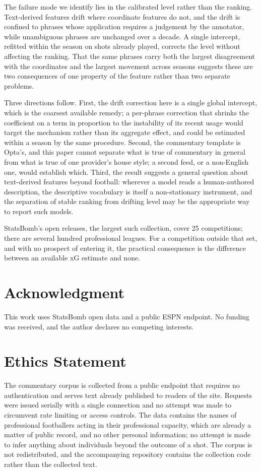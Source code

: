 \documentclass[conference]{IEEEtran}
\begin{document}
The failure mode we identify lies in the calibrated level rather than the
ranking. Text-derived features drift where coordinate features do not, and the
drift is confined to phrases whose application requires a judgement by the
annotator, while unambiguous phrases are unchanged over a decade. A single
intercept, refitted within the season on shots already played, corrects the
level without affecting the ranking. That the same phrases carry both the
largest disagreement with the coordinates and the largest movement across
seasons suggests these are two consequences of one property of the feature
rather than two separate problems.

Three directions follow. First, the drift correction here is a single global
intercept, which is the coarsest available remedy; a per-phrase correction
that shrinks the coefficient on a term in proportion to the instability of its
recent usage would target the mechanism rather than its aggregate effect, and
could be estimated within a season by the same procedure. Second, the
commentary template is Opta's, and this paper cannot separate what is true of
commentary in general from what is true of one provider's house style; a
second feed, or a non-English one, would establish which. Third, the result
suggests a general question about text-derived features beyond football:
wherever a model reads a human-authored description, the descriptive vocabulary
is itself a non-stationary instrument, and the separation of stable ranking
from drifting level may be the appropriate way to report such models.

StatsBomb's open releases, the largest such collection, cover 25
competitions; there are several hundred professional leagues. For a competition
outside that set, and with no prospect of entering it, the practical
consequence is the difference between an available xG estimate and none.

\section*{Acknowledgment}

This work uses StatsBomb open data and a public ESPN endpoint. No funding was
received, and the author declares no competing interests.

\section*{Ethics Statement}

The commentary corpus is collected from a public endpoint that requires no
authentication and serves text already published to readers of the site.
Requests were issued serially with a single connection and no attempt was made
to circumvent rate limiting or access controls. The data contains the names of
professional footballers acting in their professional capacity, which are
already a matter of public record, and no other personal information; no
attempt is made to infer anything about individuals beyond the outcome of a
shot. The corpus is not redistributed, and the accompanying repository
contains the collection code rather than the collected text.
\end{document}
